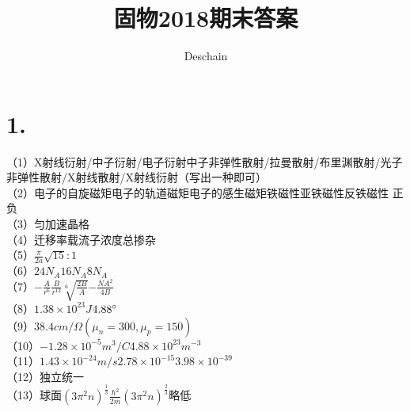 \documentclass[UTF8]{ctexart}
\title{固物2018期末答案}
\author{Deschain}
\begin{document}
\maketitle
\section*{1.}
（1）X射线衍射/中子衍射/电子衍射中子非弹性散射/拉曼散射/布里渊散射/光子非弹性散射/X射线散射/X射线衍射（写出一种即可）\\
（2）电子的自旋磁矩电子的轨道磁矩电子的感生磁矩铁磁性亚铁磁性反铁磁性
正负\\
（3）匀加速晶格\\
（4）迁移率载流子浓度总掺杂\\
（5）$\frac{\pi}{2a}$$\sqrt{15}:1$\\
（6）$24N_A$$16N_A$$8N_A$\\
（7）$-\frac{A}{r^6}$$\frac{B}{r^{12}}$$\sqrt[6]{\frac{2B}{A}}$$-\frac{NA^2}{4B}$\\
（8）$1.38\times10^{23}J$$4.88\degree$\\
（9）$38.4cm/\Omega(\mu_n=300,\mu_p=150)$\\
（10）$-1.28\times10^{-5}m^3/C$$4.88\times10^{23}m^{-3}$\\
（11）$1.43\times10^{-24}m/s$$2.78\times10^{-15}$$3.98\times10^{-39}$\\
（12）独立统一\\
（13）球面$(3\pi^2n)^{\frac{1}{3}}$$\frac{\hbar^2}{2m}(3\pi^2n)^{\frac{2}{3}}$略低\\
\end{document}
